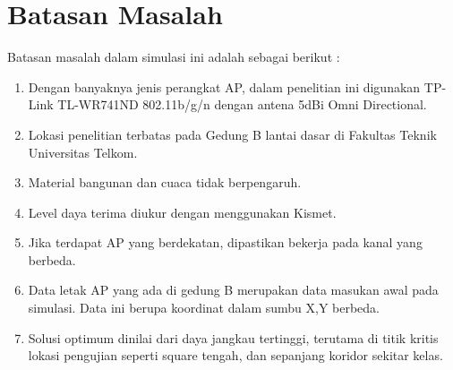 \documentclass[12pt,a4paper]{report}
\begin{document}
		\section{Batasan Masalah}
		Batasan masalah dalam simulasi ini adalah sebagai berikut :
		\begin{enumerate}
			\item Dengan banyaknya jenis perangkat AP, dalam penelitian ini digunakan TP-Link TL-WR741ND 802.11b/g/n dengan antena 5dBi Omni Directional.
			\item Lokasi penelitian terbatas pada Gedung B lantai dasar di Fakultas Teknik Universitas Telkom.
			\item Material bangunan dan cuaca tidak berpengaruh.
			\item Level daya terima diukur dengan menggunakan Kismet.
			\item Jika terdapat AP yang berdekatan, dipastikan bekerja pada kanal yang berbeda.
			\item Data letak AP yang ada di gedung B merupakan data masukan awal pada simulasi. Data ini berupa koordinat dalam sumbu X,Y berbeda.
			\item Solusi optimum dinilai dari daya jangkau tertinggi, terutama di titik kritis lokasi pengujian seperti square tengah, dan sepanjang koridor sekitar kelas.
		\end{enumerate}
\end{document}
